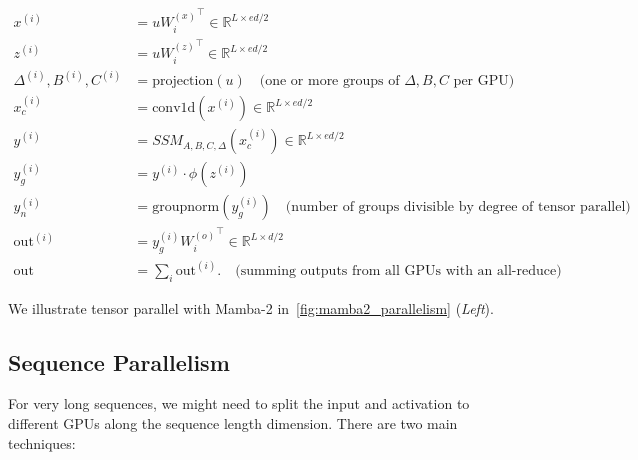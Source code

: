 \begin{align*}
   x^{(i)} &= u {W^{(x)}_i}^\top \in \mathbb{R}^{L \times ed / 2} \\
   z^{(i)} &= u {W^{(z)}_i}^\top \in \mathbb{R}^{L \times ed / 2} \\
   \Delta^{(i)}, B^{(i)}, C^{(i)} &= \text{projection}(u) \quad \text{(one or more groups of $\Delta, B, C$ per GPU)} \\
   x_c^{(i)} &= \mathrm{conv1d}(x^{(i)}) \in \mathbb{R}^{L \times ed / 2} \\
   y^{(i)} &= SSM_{A, B, C, \Delta}(x_c^{(i)}) \in \mathbb{R}^{L \times ed/2}  \\
   y_g^{(i)} &= y^{(i)} \cdot \phi(z^{(i)})  \\
   y_n^{(i)} &= \mathrm{groupnorm}(y_g^{(i)}) \quad \text{(number of groups divisible by degree of tensor parallel)} \\
   \mathrm{out}^{(i)} &= y_g^{(i)} {W^{(o)}_i}^\top \in \mathbb{R}^{L \times d / 2} \\
   \mathrm{out} &= \sum_i \mathrm{out}^{(i)}. \quad \text{(summing outputs from all GPUs with an all-reduce)}
\end{align*}

We illustrate tensor parallel with Mamba-2 in~\ref{fig:mamba2_parallelism} (\emph{Left}).

\subsection{Sequence Parallelism}
\label{subsec:sp}

For very long sequences, we might need to split the input and activation to different GPUs along the sequence length dimension. There are two main techniques:

